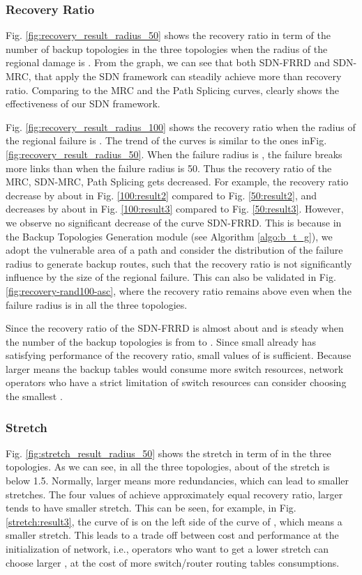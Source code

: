 \documentclass[10pt,journal]{IEEEtran}
\begin{document}
\subsubsection{Recovery Ratio}
Fig. \ref{fig:recovery_result_radius_50} shows the recovery ratio in term of the number of backup topologies  in the three topologies when the radius of the regional damage is . From the graph, we can see that both SDN-FRRD and SDN-MRC, that apply the SDN framework can steadily achieve more than  recovery ratio. Comparing to the MRC and the Path Splicing curves, clearly shows the effectiveness of our SDN framework.

Fig. \ref{fig:recovery_result_radius_100} shows the recovery ratio when the radius of the regional failure is . The trend of the curves is similar to the ones inFig. \ref{fig:recovery_result_radius_50}. When the failure radius is , the failure breaks more links than when the failure radius is 50. Thus the recovery ratio of the MRC, SDN-MRC, Path Splicing gets decreased. For example, the recovery ratio decrease by about  in Fig. \ref{100:result2} compared to Fig. \ref{50:result2}, and decreases by about  in Fig. \ref{100:result3} compared to Fig. \ref{50:result3}. However, we observe no significant decrease of the curve SDN-FRRD. This is because in the Backup Topologies Generation module (see Algorithm \ref{algo:b_t_g}), we adopt the vulnerable area of a path and consider the distribution of the failure radius to generate backup routes, such that the recovery ratio is not significantly influence by the size of the regional failure. This can also be validated in Fig. \ref{fig:recovery-rand100-asc}, where the recovery ratio remains above  even when the failure radius is  in all the three topologies.

Since the recovery ratio of the SDN-FRRD is almost about  and is steady when the number of the backup topologies  is from  to . Since small  already has satisfying performance of the recovery ratio, small values of  is sufficient. Because larger  means the backup tables would consume more switch resources, network operators who have a strict limitation of switch resources can consider choosing the smallest .
\subsubsection{Stretch}
Fig. \ref{fig:stretch_result_radius_50} shows the stretch in term of  in the three topologies. As we can see, in all the three topologies, about  of the stretch is below 1.5. Normally, larger  means more redundancies, which can lead to smaller stretches. The four values of  achieve approximately equal recovery ratio, larger  tends to have smaller stretch. This can be seen, for example, in Fig. \ref{stretch:result3}, the curve of  is on the left side of the curve of , which means a smaller stretch. This leads to a trade off between cost and performance at the initialization of network, i.e., operators who want to get a lower stretch can choose larger , at the cost of more switch/router routing tables consumptions.
\end{document}
